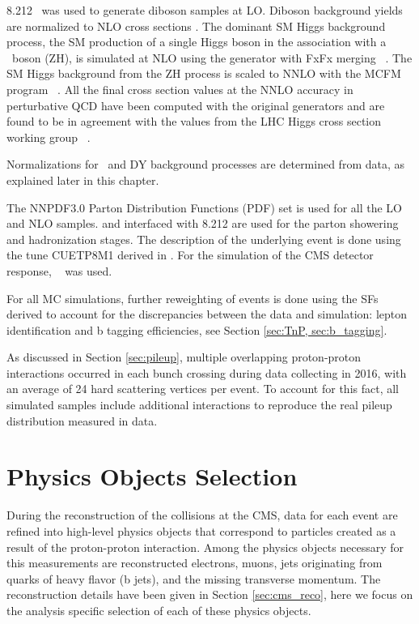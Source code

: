 \begin{small}
{\PYTHIA} 8.212~\cite{Sjostrand:2007gs,Sjostrand:2014zea} was used to generate diboson samples at LO. Diboson
background yields are normalized to NLO cross sections
\cite{CMS-PAS-SMP-18-002, CMS-PAS-SMP-16-006, Khachatryan:2016txa}. The dominant SM Higgs background process, the SM production of a single Higgs boson in the association with a \PZ ~boson (ZH), is simulated
at NLO using the {\MGMCatNLO} generator with FxFx merging ~\cite{Frederix:2012ps}. 
The SM Higgs background from the ZH process is scaled to NNLO with the
MCFM program ~\cite{Campbell:2010ff}. All the final cross section values at the NNLO accuracy in perturbative QCD have been computed with the original generators and are found to be in agreement with the values from the LHC Higgs cross section working group ~\cite{LHCHXSWG, xsecZH, xsecTT, xsecST, xsecVV}.

Normalizations for \ttbar ~and DY background processes are determined from data, as explained later in this chapter.

The NNPDF3.0 \cite{Ball:2014uwa} Parton Distribution Functions
(PDF) set is used for all the LO and NLO samples. {\POWHEG} and {\MGMCatNLO} interfaced with
{\PYTHIA}8.212 are used for the parton
showering and hadronization stages. The description of the underlying event is done using the tune CUETP8M1 derived in \cite{Khachatryan:2015pea}. For the simulation of the CMS detector response, \GEANTfour~\cite{GEANT4} was used. 

For all MC simulations, further reweighting of events is done using the SFs derived to account for the discrepancies between the data and simulation: lepton identification and b tagging efficiencies, see Section \ref{sec:TnP, sec:b_tagging}.

As discussed in Section \ref{sec:pileup}, multiple overlapping proton-proton interactions occurred in each bunch crossing during data collecting in 2016, with an average of 24 hard scattering vertices per event. To account for this fact, all simulated samples include additional interactions to reproduce the real pileup distribution measured in data.

\section{Physics Objects Selection}
\label{sec:objects}


During the reconstruction of the collisions at the CMS, data for each event are refined into high-level physics objects that correspond to particles created as a result of the proton-proton interaction. Among the physics objects necessary for this measurements are reconstructed electrons, muons, jets originating from quarks of heavy flavor (b jets), and the missing transverse momentum. The reconstruction details have been given in Section \ref{sec:cms_reco}, here we focus on the analysis specific selection of each of these physics objects.


\end{small}
